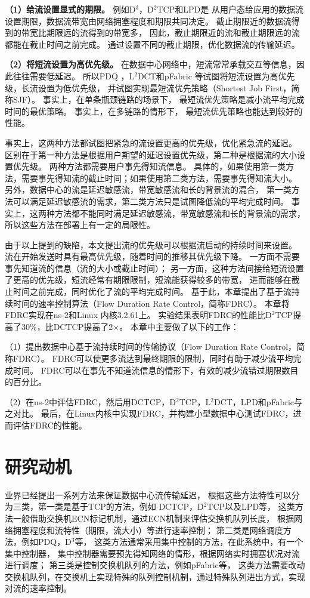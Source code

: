 \textbf{（1）给流设置显式的期限。} 
例如D$^3$\cite{D3}，D$^2$TCP\cite{D2TCP}和LPD\cite{LPD}是
从用户态给应用的数据流设置期限，数据流带宽由网络拥塞程度和期限共同决定。
截止期限近的数据流得到的带宽比期限远的流得到的带宽多，
因此，截止期限近的流和截止期限远的流都能在截止时间之前完成。
通过设置不同的截止期限，优化数据流的传输延迟。

\textbf{（2）将短流设置为高优先级。}
在数据中心网络中，短流常常承载交互等信息，因此往往需要低延迟。
所以PDQ \cite{PDQ}，L$^2$DCT\cite{L2DCT}和pFabric \cite{pFabric}等试图将短流设置为高优先级，长流设置为低优先级，
并试图实现最短流优先策略（Shortest Job First，简称SJF）。
事实上，在单条瓶颈链路的场景下，
最短流优先策略是减小流平均完成时间的最优策略。
事实上，在多链路的情形下，
最短流优先策略也能达到较好的性能\cite{L2DCT,pFabric}。


事实上，这两种方法都试图把紧急的流设置更高的优先级，优化紧急流的延迟。
区别在于第一种方法是根据用户期望的延迟设置优先级，第二种是根据流的大小设置优先级。
两种方法都需要用户事先得知流信息。
具体的，如果使用第一类方法，需要事先得知流的截止时间；如果使用第二类方法，需要事先得知流大小。
另外，数据中心的流是延迟敏感流，带宽敏感流和长的背景流的混合，
第一类方法可以满足延迟敏感流的需求，第二类方法只是试图降低流的平均完成时间。
事实上，这两种方法都不能同时满足延迟敏感流，带宽敏感流和长的背景流的需求，
所以这些方法在部署上有一定的局限性。

由于以上提到的缺陷，本文提出流的优先级可以根据流启动的持续时间来设置。
流在开始发送时具有最高优先级，随着时间的推移其优先级下降。
 一方面不需要事先知道流的信息（流的大小或截止时间）；
另一方面，这种方法间接给短流设置了更高的优先级，短流经常有期限限制，短流能获得较多的带宽，
进而能够在截止时间之前完成，同时优化了流的平均完成时间。
基于此，本章提出了基于流持续时间的速率控制算法（Flow Duration Rate Control，简称FDRC）。
本章将FDRC实现在ns-2\cite{ns2}和Linux 内核3.2.61上。
实验结果表明FDRC的性能比D$^2$TCP提高了$30\%$，比DCTCP提高了2$\times$。
本章中主要做了以下的工作：

（1）提出数据中心基于流持续时间的传输协议（Flow Duration Rate Control，简称FDRC）。
FDRC可以使更多流达到最终期限的限制，同时有助于减少流平均完成时间。
FDRC可以在事先不知道流信息的情形下，有效的减少流错过期限数目的百分比。

（2）在ns-2中评估FDRC，然后用DCTCP，D$^2$TCP，L$^2$DCT，LPD和pFabric与之对比。
最后，在Linux内核中实现FDRC，并构建小型数据中心测试FDRC，进而评估FDRC的性能。


\section{研究动机}\label{fdrc_motivation}
业界已经提出一系列方法来保证数据中心流传输延迟，
根据这些方法特性可以分为三类，第一类是基于TCP的方法，例如
DCTCP\cite{DCTCP}，D$^2$TCP\cite{D2TCP}以及LPD\cite{LPD}等，
这类方法一般借助交换机ECN标记机制，通过ECN机制来评估交换机队列长度，
根据网络拥塞程度和流特性（期限，流大小）等进行速率控制；
第二类是网络调度方法，例如PDQ\cite{PDQ}，D$^3$\cite{D3}等，
这类方法通常采用集中控制的方法，在此系统中，有一个集中控制器，
集中控制器需要预先得知网络的情形，根据网络实时拥塞状况对流进行调度；
第三类是控制交换机队列的方法，例如pFabric\cite{pFabric}等，
这类方法需要改动交换机队列，在交换机上实现特殊的队列控制机制，通过特殊队列进出方式，实现对流的速率控制。


